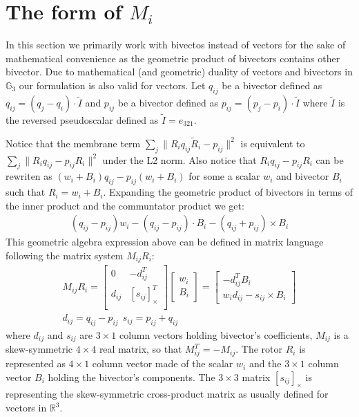 \documentclass{birkjour}
\numberwithin{equation}{section}
\begin{document}
 \section{The form of $M_i$}
 \label{section:the_form_of_arap_matrix}
 
In this section we primarily work with bivectos instead of vectors for the sake of mathematical convenience as the geometric product of bivectors contains other bivector. Due to mathematical (and geometric) duality of vectors and bivectors in $\mathbb{G}_3$ our formulation is also valid for vectors. Let $q_{ij}$ be a bivector defined as $q_{ij} = (q_j - q_i) \cdot \tilde I$ and  $p_{ij}$ be a bivector defined as $p_{ij} = (p_j - p_i)  \cdot  \tilde I$ where $\tilde I$ is the reversed pseudoscalar defined as $\tilde I = e_{321}$.

Notice that the membrane term $\sum_j \|R_i q_{ij} \tilde R_i - p_{ij} \|^2$ is equivalent to $\sum_j  \|R_i q_{ij} - p_{ij} R_i\|^2$ under the L2 norm. Also notice that  $R_i q_{ij} - p_{ij} R_i$ can be rewriten as $(w_i + B_i) q_{ij}  - p_{ij} (w_i + B_i)$ for some a scalar $w_i$ and bivector $B_i$ such that $R_i = w_i + B_i$. Expanding the geometric product of bivectors in terms of the inner product and the communtator product we get:
\begin{eqnarray}
	(q_{ij} - p_{ij}) w_i - (q_{ij} - p_{ij}) \cdot B_i - (q_{ij} + p_{ij}) \times B_i
\end{eqnarray}
This geometric algebra expression above can be defined in matrix language following the matrix system $M_{ij} R_i$:
\begin{eqnarray}
	M_{ij} R_i =
	\left[\begin{array}{cc}
		0        &       -d_{ij}^T \\
		d_{ij}  &   \left[ s_{ij} \right]^T_\times \\
	\end{array}\right]
	\left[\begin{array}{c} 
		w_i \\
		B_i
	\end{array}\right] = 
	\left[\begin{array}{c}
		-d_{ij}^T B_i \\
		w_i d_{ij} - s_{ij} \times B_i 
	\end{array}\right]\\
	d_{ij} = q_{ij} - p_{ij} \ \ s_{ij} = p_{ij} + q_{ij}  \nonumber
\end{eqnarray}
where $d_{ij}$ and $s_{ij}$ are $3 \times 1$ column vectors holding bivector's coefficients, $M_{ij}$ is a skew-symmetric $4\times 4$ real matrix, so that $M_{ij}^T = -M_{ij}$. The rotor $R_i$ is represented as $4 \times 1$ column vector made of the scalar $w_i$ and the $3 \times 1$ column vector $B_i$ holding the bivector's components. The $3\times 3$ matrix $\left[ s_{ij} \right]_\times$ is representing the skew-symmetric cross-product matrix as usually defined for vectors in $\mathbb R^3$.
\end{document}
